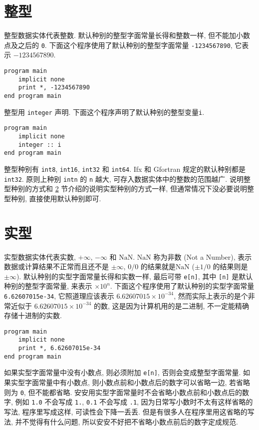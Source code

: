 \section{整型}

整型数据实体代表整数. 默认种别的整型字面常量长得和整数一样, 但不能加小数点及之后的 \texttt{0}. 下面这个程序使用了默认种别的整型字面常量 \texttt{-1234567890}, 它表示 $-1234567890$.
\begin{lstlisting}
program main
    implicit none
    print *, -1234567890
end program main
\end{lstlisting}

整型用 \texttt{integer} 声明. 下面这个程序声明了默认种别的整型变量\texttt{i}.
\begin{lstlisting}
program main
    implicit none
    integer :: i
end program main
\end{lstlisting}

整型种别有 \texttt{int8}, \texttt{int16}, \texttt{int32} 和 \texttt{int64}. Ifx 和 Gfortran 规定的默认种别都是 \texttt{int32}. 原则上种别 \texttt{intn} 的 \texttt{n} 越大, 可存入数据实体中的整数的范围越广. 说明整型种别的方式和 \ref{fortran_real} 节介绍的说明实型种别的方式一样, 但通常情况下没必要说明整型种别, 直接使用默认种别即可.

\section{实型}\label{fortran_real}

实型数据实体代表实数, $+\infty$, $-\infty$ 和 $\text{NaN}$. $\text{NaN}$ 称为非数 (Not a Number), 表示数据或计算结果不正常而且还不是 $\pm\infty$, $0/0$ 的结果就是$\text{NaN}$ ($\pm 1/0$ 的结果则是 $\pm\infty$). 默认种别的实型字面常量长得和实数一样, 最后可带 \texttt{e[n]}, 其中 \texttt{[n]} 是默认种别的整型字面常量, 来表示 $\times 10 ^ n$. 下面这个程序使用了默认种别的实型字面常量 \texttt{6.62607015e-34}, 它照道理应该表示 $6.62607015\times10^{-34}$, 然而实际上表示的是个非常近似于 $6.62607015\times10^{-34}$ 的数, 这是因为计算机用的是二进制, 不一定能精确存储十进制的实数.
\begin{lstlisting}
program main
    implicit none
    print *, 6.62607015e-34
end program main
\end{lstlisting}

如果实型字面常量中没有小数点, 则必须附加 \texttt{e[n]}, 否则会变成整型字面常量. 如果实型字面常量中有小数点, 则小数点前和小数点后的数字可以省略一边, 若省略则为 \texttt{0}, 但不能都省略. 安安用实型字面常量时不会省略小数点前和小数点后的数字, 例如 \texttt{1.0} 不会写成 \texttt{1.}, \texttt{0.1} 不会写成 \texttt{.1}, 因为日常写小数时不太有这样省略的写法, 程序里写成这样, 可读性会下降一丢丢. 但是有很多人在程序里用这省略的写法, 并不觉得有什么问题, 所以安安不好把不省略小数点前后的数字定成规范. 

